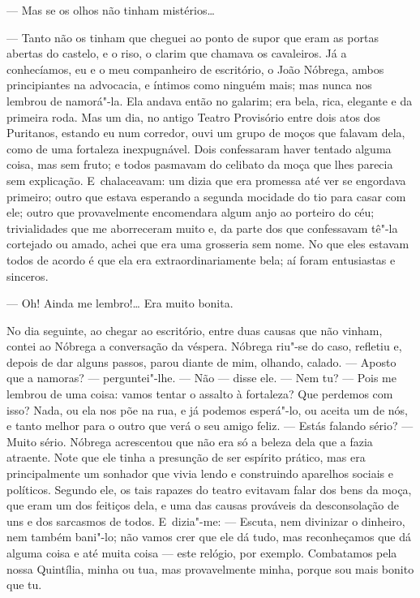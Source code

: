 \begin{linenumbers}
--- Mas se os olhos não tinham mistérios\ldots{}

--- Tanto não os tinham que cheguei ao ponto de supor que eram as portas
abertas do castelo, e o riso, o clarim que chamava os cavaleiros. Já a
conhecíamos, eu e o meu companheiro de escritório, o João Nóbrega, ambos
principiantes na advocacia, e íntimos como ninguém mais; mas nunca nos
lembrou de namorá"-la. Ela andava então no galarim; era bela, rica,
elegante e da primeira roda. Mas um dia, no antigo Teatro Provisório
entre dois atos dos Puritanos, estando eu num corredor, ouvi um grupo de
moços que falavam dela, como de uma fortaleza inexpugnável. Dois
confessaram haver tentado alguma coisa, mas sem fruto; e todos pasmavam
do celibato da moça que lhes parecia sem explicação. E~chalaceavam: um
dizia que era promessa até ver se engordava primeiro; outro que estava
esperando a segunda mocidade do tio para casar com ele; outro que
provavelmente encomendara algum anjo ao porteiro do céu; trivialidades
que me aborreceram muito e, da parte dos que confessavam tê"-la cortejado
ou amado, achei que era uma grosseria sem nome. No que eles estavam
todos de acordo é que ela era extraordinariamente bela; aí foram
entusiastas e sinceros.

--- Oh! Ainda me lembro!\ldots{} Era muito bonita.

No dia seguinte, ao chegar ao escritório, entre duas causas que não
vinham, contei ao Nóbrega a conversação da véspera. Nóbrega riu"-se do
caso, refletiu e, depois de dar alguns passos, parou diante de mim,
olhando, calado. --- Aposto que a namoras? ­--- perguntei"-lhe. --- Não ---
disse ele. --- Nem tu? --- Pois me lembrou de uma coisa: vamos tentar o
assalto à fortaleza? Que perdemos com isso? Nada, ou ela nos põe na rua,
e já podemos esperá"-lo, ou aceita um de nós, e tanto melhor para o outro
que verá o seu amigo feliz. --- Estás falando sério? --- Muito sério.
Nóbrega acrescentou que não era só a beleza dela que a fazia atraente.
Note que ele tinha a presunção de ser espírito prático, mas era
principalmente um sonhador que vivia lendo e construindo aparelhos
sociais e políticos. Segundo ele, os tais rapazes do teatro evitavam
falar dos bens da moça, que eram um dos feitiços dela, e uma das causas
prováveis da desconsolação de uns e dos sarcasmos de todos. E~dizia"-me:
--- Escuta, nem divinizar o dinheiro, nem também bani"-lo; não vamos crer
que ele dá tudo, mas reconheçamos que dá alguma coisa e até muita coisa
--- este relógio, por exemplo. Combatamos pela nossa Quintília, minha ou
tua, mas provavelmente minha, porque sou mais bonito que tu.


\end{linenumbers}
